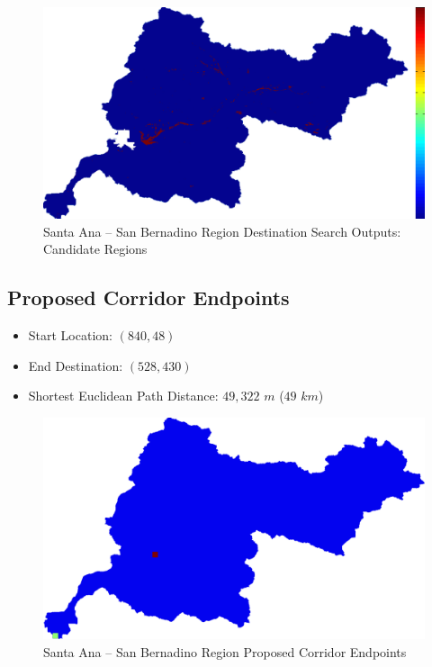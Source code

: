         \begin{figure}[!h]
            \begin{center}
            \includegraphics[width=5.5in]{figures/SanBernadino_Search_Output.png}   
            \caption{Santa Ana -- San Bernadino Region Destination Search Outputs: Candidate Regions}
            \label{fig:SASBdsoutputs_cand}
            \end{center}
        \end{figure}

    \subsection{Proposed Corridor Endpoints}
    
    \begin{itemize}
      \setlength{\itemsep}{0cm}
      \setlength{\parskip}{0cm}
        \item Start Location: $(840,48)$
        \item End Destination: $(528,430)$
        \item Shortest Euclidean Path Distance: $49,322$ $m$ ($49$ $km$)
    \end{itemize}
    
        \begin{figure}[!h]
            \begin{center}
            \includegraphics[width=5.5in]{figures/SanBernadino_Endpoints.png}   
            \caption{Santa Ana -- San Bernadino Region Proposed Corridor Endpoints}
            \label{fig:SASBendpoints}
            \end{center}
        \end{figure}
    
